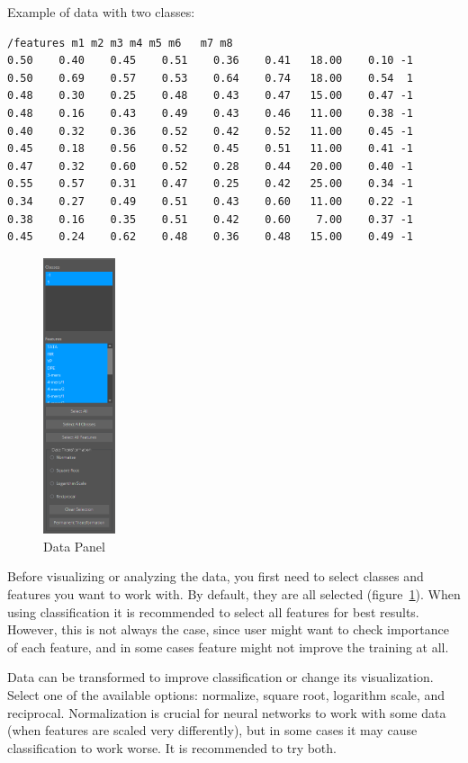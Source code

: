 \documentclass[a4paper,12pt,english]{report}
\begin{document}
Example of data with two classes:

\begin{lstlisting}
/features m1 m2 m3 m4 m5 m6   m7 m8 
0.50    0.40    0.45    0.51    0.36    0.41   18.00    0.10 -1 
0.50    0.69    0.57    0.53    0.64    0.74   18.00    0.54  1   
0.48    0.30    0.25    0.48    0.43    0.47   15.00    0.47 -1
0.48    0.16    0.43    0.49    0.43    0.46   11.00    0.38 -1
0.40    0.32    0.36    0.52    0.42    0.52   11.00    0.45 -1
0.45    0.18    0.56    0.52    0.45    0.51   11.00    0.41 -1
0.47    0.32    0.60    0.52    0.28    0.44   20.00    0.40 -1
0.55    0.57    0.31    0.47    0.25    0.42   25.00    0.34 -1
0.34    0.27    0.49    0.51    0.43    0.60   11.00    0.22 -1
0.38    0.16    0.35    0.51    0.42    0.60    7.00    0.37 -1
0.45    0.24    0.62    0.48    0.36    0.48   15.00    0.49 -1  
\end{lstlisting}

\begin{figure} 
\begin{center}
\includegraphics[width = 60pt]{fig2.png}
\end{center}
\caption{Data Panel}
\label{fig:fig2}
\end{figure}

Before visualizing or analyzing the data, you first need to select classes and features you want to work with. By default, they are all selected (figure~\ref{fig:fig2}). When using classification it is recommended to select all features for best results. However, this is not always the case, since user might want to check importance of each feature, and in some cases feature might not improve the training at all. 

Data can be transformed to improve classification or change its visualization. Select one of the available options: normalize, square root, logarithm scale, and reciprocal. Normalization is crucial for neural networks to work with some data (when features are scaled very differently), but in some cases it may cause classification to work worse. It is recommended to try both.
\end{document}
